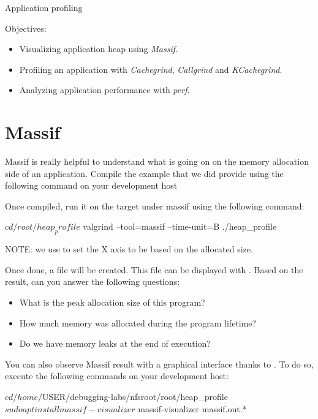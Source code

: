 \subchapter
{Application profiling}
{Objectives:
  \begin{itemize}
    \item Visualizing application heap using {\em Massif}.
    \item Profiling an application with {\em Cachegrind}, {\em Callgrind} and
          {\em KCachegrind}.
    \item Analyzing application performance with {\em perf}.
  \end{itemize}
}

\section{Massif}

Massif is really helpful to understand what is going on on the memory allocation
side of an application. Compile the  example that we did provide
using the following command on your development host


Once compiled, run it on the target under massif using the following command:

\begin{bashinput}
$ cd /root/heap_profile
$ valgrind --tool=massif --time-unit=B ./heap_profile
\end{bashinput}

NOTE: we use  to set the X axis to be based on the allocated
size.

Once done, a  file will be created. This file can be
displayed with . Based on the result, can you answer the
following questions:
\begin{itemize}
  \item What is the peak allocation size of this program?
  \item How much memory was allocated during the program lifetime?
  \item Do we have memory leaks at the end of execution?
\end{itemize}

You can also observe Massif result with a graphical interface thanks to
. To do so, execute the following commands on your
development host:

\begin{bashinput}
$ cd /home/$USER/debugging-labs/nfsroot/root/heap_profile
$ sudo apt install massif-visualizer
$ massif-visualizer massif.out.*
\end{bashinput}

